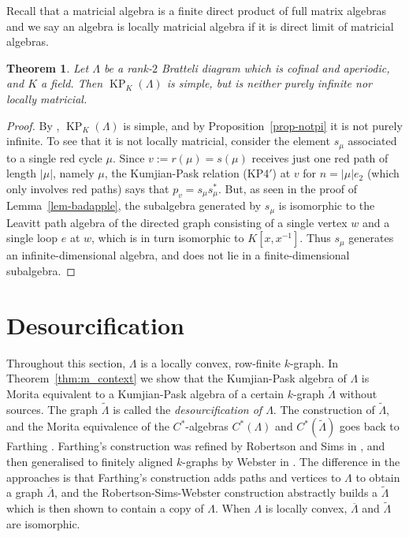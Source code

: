 \documentclass[a4paper,12pt]{amsart}
\numberwithin{equation}{section}
\newtheorem{thm}{Theorem}[section]
\theoremstyle{definition}
\theoremstyle{remark}
\begin{document}
Recall that a matricial algebra is a finite direct product of full matrix algebras and
we say an algebra is locally matricial algebra if it is direct limit of matricial algebras.

\begin{thm}\label{thm-point} Let $\Lambda$ be a rank-$2$ Bratteli diagram which is cofinal and aperiodic, and $K$ a field. Then $\operatorname{KP}_K(\Lambda)$ is simple, but is neither purely infinite nor locally matricial.
\end{thm}

\begin{proof}
By \cite[Theorem~6.1]{ACaHR},  $\operatorname{KP}_K(\Lambda)$ is simple, and by Proposition~\ref{prop-notpi} it is not purely infinite. To see that it is not locally matricial, consider the element $s_\mu$ associated to a single red cycle $\mu$. Since $v:=r(\mu)=s(\mu)$ receives just one red path of length $|\mu|$, namely $\mu$, the Kumjian-Pask relation (KP4$'$) at $v$  for $n=|\mu|e_2$ (which only involves red paths) says that $p_v=s_\mu s_\mu^*$. But, as seen in the proof of Lemma~\ref{lem-badapple}, the subalgebra generated by  $s_\mu$ is isomorphic to the Leavitt path algebra of the directed graph consisting of a single vertex $w$ and a single loop $e$ at $w$, which is in turn isomorphic to $K[x,x^{-1}]$. Thus $s_\mu$ generates an infinite-dimensional algebra, and  does not lie in a finite-dimensional subalgebra.
\end{proof}

\section{Desourcification}
Throughout this section,  $\Lambda$ is a locally convex, row-finite $k$-graph.
In Theorem~\ref{thm:m_context}  we show that the Kumjian-Pask algebra of $\Lambda$ is
Morita equivalent to a Kumjian-Pask algebra of a certain $k$-graph ${\tilde{\Lambda}}$ 
without sources. The graph ${\tilde{\Lambda}}$  is called the \emph{desourcification of $\Lambda$}.  The construction of ${\tilde{\Lambda}}$, and the Morita equivalence of the $C^*$-algebras $C^*(\Lambda)$ and $C^*({\tilde{\Lambda}})$ goes back to Farthing \cite{F}.  Farthing's construction was refined by Robertson and Sims in \cite{RS2009}, and then generalised to finitely aligned $k$-graphs by Webster in \cite{W}. The difference in the approaches is that Farthing's construction adds paths and vertices to $\Lambda$ to obtain a graph $\overline{\Lambda}$, and the Robertson-Sims-Webster construction abstractly builds a $\tilde\Lambda$ which is then shown to contain a copy of $\Lambda$. When $\Lambda$ is locally convex, 
$\overline\Lambda$ and $\tilde\Lambda$ are isomorphic.   
\end{document}
